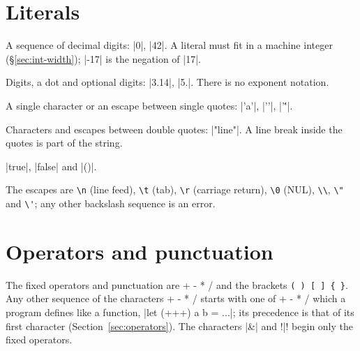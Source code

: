 \section{Literals}

\begin{description}[style=nextline,leftmargin=2em,font=\normalfont\sffamily\bfseries]
  \item[Integers] A sequence of decimal digits: \fc|0|, \fc|42|. A literal must fit
    in a machine integer (\S\ref{sec:int-width}); \fc|-17| is the negation of
    \fc|17|.
  \item[Floats] Digits, a dot and optional digits: \fc|3.14|, \fc|5.|. There is no
    exponent notation.
  \item[Characters] A single character or an escape between single quotes:
    \fc|'a'|, \fc|'\n'|, \fc|'\''|.
  \item[Strings] Characters and escapes between double quotes:
    \fc|"line\n"|. A line break inside the quotes is part of the string.
  \item[Booleans and unit] \fc|true|, \fc|false| and \fc|()|.
\end{description}

The escapes are \verb|\n| (line feed), \verb|\t| (tab), \verb|\r| (carriage
return), \verb|\0| (NUL), \verb|\\|, \verb|\"| and \verb|\'|; any other
backslash sequence is an error.


\section{Operators and punctuation}
The fixed operators and punctuation are
\fc@+ - * / %
and the brackets \texttt{( ) [ ] \{ \}}.
Any other sequence of the characters \fc@+ - * / %
starts with one of \fc@+ - * / %
which a program defines like a function, \fc|let (+++) a b = ...|; its
precedence is that of its first character (Section~\ref{sec:operators}).
The characters \fc|&| and \fc!|! begin only the fixed operators.
